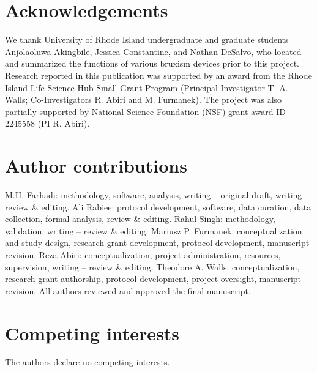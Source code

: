 \documentclass[pdflatex,sn-nature,iicol]{sn-jnl}
\begin{document}
\section*{Acknowledgements}
We thank University of Rhode Island undergraduate and graduate students Anjolaoluwa Akingbile, Jessica Constantine, and Nathan DeSalvo, who located and summarized the functions of various bruxism devices prior to this project. Research reported in this publication was supported by an award from the Rhode Island Life Science Hub Small Grant Program (Principal Investigator T. A. Walls; Co-Investigators R. Abiri and M. Furmanek). The project was also partially supported by National Science Foundation (NSF) grant award ID 2245558 (PI R. Abiri).

\section*{Author contributions}
M.H. Farhadi: methodology, software, analysis, writing -- original draft, writing -- review \& editing. Ali Rabiee: protocol development, software, data curation, data collection, formal analysis, review \& editing. Rahul Singh: methodology, validation, writing -- review \& editing. Mariusz P. Furmanek: conceptualization and study design, research-grant development, protocol development, manuscript revision. Reza Abiri: conceptualization, project administration, resources, supervision, writing -- review \& editing. Theodore A. Walls: conceptualization, research-grant authorship, protocol development, project oversight, manuscript revision. All authors reviewed and approved the final manuscript.

\section*{Competing interests}
The authors declare no competing interests.


\end{document}
